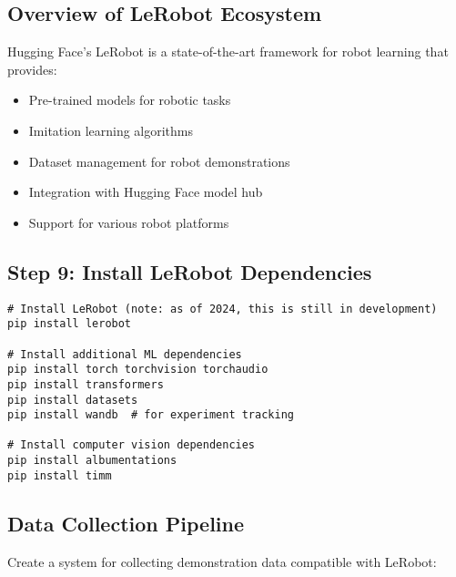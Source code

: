 \documentclass[11pt,a4paper]{article}
\begin{document}
\subsection{Overview of LeRobot Ecosystem}

Hugging Face's LeRobot is a state-of-the-art framework for robot learning that provides:

\begin{itemize}
    \item Pre-trained models for robotic tasks
    \item Imitation learning algorithms
    \item Dataset management for robot demonstrations
    \item Integration with Hugging Face model hub
    \item Support for various robot platforms
\end{itemize}

\subsection{Step 9: Install LeRobot Dependencies}

\begin{lstlisting}[style=bashstyle, caption={Install LeRobot framework}]
# Install LeRobot (note: as of 2024, this is still in development)
pip install lerobot

# Install additional ML dependencies
pip install torch torchvision torchaudio
pip install transformers
pip install datasets
pip install wandb  # for experiment tracking

# Install computer vision dependencies
pip install albumentations
pip install timm
\end{lstlisting}

\subsection{Data Collection Pipeline}

Create a system for collecting demonstration data compatible with LeRobot:
\end{document}
